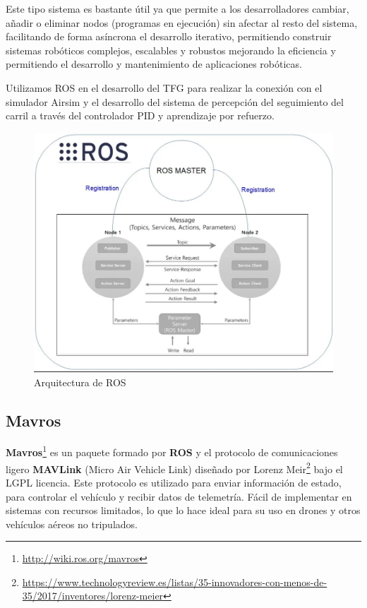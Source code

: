Este tipo sistema es bastante útil ya que permite a los desarrolladores cambiar, añadir o eliminar nodos (programas en ejecución) sin afectar al resto del sistema, facilitando de forma asíncrona
el desarrollo iterativo, permitiendo construir sistemas robóticos complejos, escalables y robustos mejorando la eficiencia y permitiendo el desarrollo y mantenimiento de aplicaciones
robóticas. \newline

Utilizamos ROS en el desarrollo del TFG para realizar la conexión con el simulador Airsim y el desarrollo del sistema de percepción del seguimiento del carril a través del controlador PID y 
aprendizaje por refuerzo. \newline


\begin{figure} [H]
    \begin{center}
      \includegraphics[scale=0.4]{figs/Plataformas_Desarollo/arq_ros.png}
    \end{center}
    \caption{Arquitectura de ROS}
    \label{fig:ArqROS}
  \end{figure}
\subsection{Mavros}
\label{sec:mavros}

\textbf{Mavros}\footnote{\url{http://wiki.ros.org/mavros}} es un paquete formado por \textbf{ROS} y el protocolo de comunicaciones ligero \textbf{MAVLink} (Micro Air Vehicle Link) diseñado por Lorenz Meir\footnote{\url{https://www.technologyreview.es/listas/35-innovadores-con-menos-de-35/2017/inventores/lorenz-meier}} bajo el LGPL licencia. Este protocolo es utilizado para enviar información de estado,
para controlar el vehículo y recibir datos de telemetría. Fácil de implementar en sistemas con recursos limitados, 
lo que lo hace ideal para su uso en drones y otros vehículos aéreos no tripulados.

